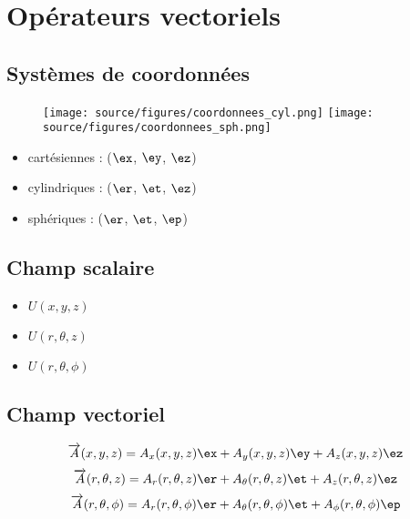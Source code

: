 \chapter*{Opérateurs vectoriels}

\section*{Systèmes de coordonnées}

\begin{figure}[!h]
\center
\hfill
\texttt{[image: source/figures/coordonnees\_cyl.png]}
\hfill
\texttt{[image: source/figures/coordonnees\_sph.png]}
\hfill
\hfill
\end{figure}

\begin{itemize}
\item cartésiennes : ($\ex$, $\ey$, $\ez$)
\item cylindriques : ($\er$, $\et$, $\ez$)
\item sphériques : ($\er$, $\et$, $\ep$)
\end{itemize}

\section*{Champ scalaire}

\begin{itemize}
\item $U(x,y,z)$
\item $U(r,\theta,z)$
\item $U(r, \theta,\phi)$
\end{itemize}

\section*{Champ vectoriel}

\begin{equation*}
\overrightarrow{A}(x,y,z) = A_x(x,y,z)\ex + A_y(x,y,z)\ey + A_z(x,y,z)\ez
\end{equation*}
\begin{equation*}
\overrightarrow{A}(r,\theta,z) = A_r(r,\theta,z)\er + A_\theta(r,\theta,z)\et + A_z(r,\theta,z)\ez
\end{equation*}
\begin{equation*}
\overrightarrow{A}(r,\theta,\phi) = A_r(r,\theta,\phi)\er + A_\theta(r,\theta,\phi)\et + A_\phi(r,\theta,\phi)\ep
\end{equation*}

